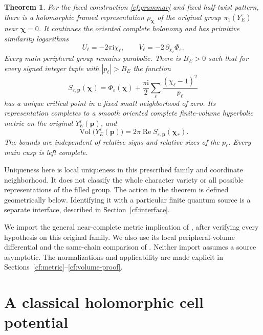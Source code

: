 \documentclass[11pt]{article}
\numberwithin{equation}{section}
\newtheorem{theorem}{Theorem}[section]
\theoremstyle{definition}\newtheorem{definition}[theorem]{Definition}
\theoremstyle{remark}\newtheorem{remark}[theorem]{Remark}
\newcommand{\ii}{\mathrm i}
\newcommand{\Vol}{\operatorname{Vol}}
\newcommand{\Rea}{\operatorname{Re}}
\newcommand{\eps}{\varepsilon}
\begin{document}
\begin{theorem}\label{cf:main}
For the fixed construction \eqref{cf:grammar} and fixed
half-twist pattern, there is a holomorphic framed representation
$\rho_{\boldsymbol\chi}$ of the original group
$\pi_1(Y^\eps_E)$ near $\boldsymbol\chi=0$. It continues the
oriented complete holonomy and has primitive similarity
logarithms
\begin{equation}\label{cf:UV}
 U_\ell=-2\pi\ii\chi_\ell,\qquad
 V_\ell=-2\,\partial_{\chi_\ell}\Phi_\eps .
\end{equation}
Every main peripheral group remains parabolic.
There is $B_E>0$ such that for every signed integer tuple with
$|p_\ell|>B_E$ the function
\begin{equation}\label{cf:action}
 S_{\eps,\mathbf p}(\boldsymbol\chi)
 =\Phi_\eps(\boldsymbol\chi)
       +\frac{\pi\ii}{2}\sum_\ell\frac{(\chi_\ell-1)^2}{p_\ell}
\end{equation}
has a unique critical point in a fixed small neighborhood of zero.
Its representation completes to a smooth oriented complete
finite-volume hyperbolic metric on the original
$Y^\eps_E(\mathbf p)$, and
\begin{equation}\label{cf:volume}
 \Vol\bigl(Y^\eps_E(\mathbf p)\bigr)
       =2\pi\Rea S_{\eps,\mathbf p}(\boldsymbol\chi_*).
\end{equation}
The bounds are independent of relative signs and relative sizes
of the $p_\ell$. Every main cusp is left complete.
\end{theorem}

Uniqueness here is local uniqueness in this prescribed family
and coordinate neighborhood. It does not classify the whole
character variety or all possible representations of the filled
group. The action in the theorem is defined geometrically below.
Identifying it with a particular finite quantum source is a
separate interface, described in Section~\ref{cf:interface}.

We import the general near-complete metric implication of
\cite[Proposition~6.1]{Marked}, after verifying every hypothesis
on this original family. We also use its local peripheral-volume
differential \cite[equation~(7.3)]{Marked} and the same-chain
comparison of \cite[Section~7.3]{Marked}. Neither import assumes
a source asymptotic. The normalizations and applicability are
made explicit in Sections~\ref{cf:metric}--\ref{cf:volume-proof}.

\section{A classical holomorphic cell potential}
\label{cf:potential}
\end{document}

